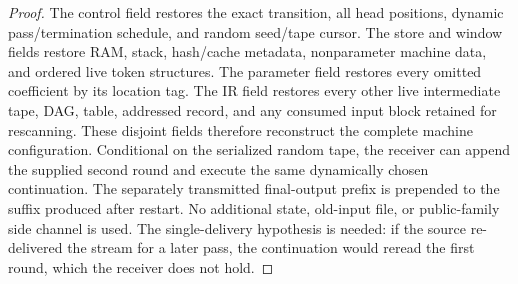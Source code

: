 \begin{proof}
The control field restores the exact transition, all head positions,
dynamic pass/termination schedule, and random seed/tape cursor.  The store
and window fields restore RAM, stack, hash/cache metadata, nonparameter
machine data, and ordered live token structures.  The parameter field
restores every omitted coefficient by its location tag.  The IR field
restores every other live intermediate tape, DAG, table, addressed record,
and any consumed input block retained for rescanning.  These disjoint fields
therefore reconstruct the complete machine configuration.  Conditional on
the serialized random tape, the receiver can append the supplied second
round and execute the same dynamically chosen continuation.  The separately
transmitted final-output prefix is prepended to the suffix produced after
restart.  No additional state, old-input file, or public-family side channel
is used.  The single-delivery hypothesis is needed: if the source
re-delivered the stream for a later pass, the continuation would reread the
first round, which the receiver does not hold.
\end{proof}
